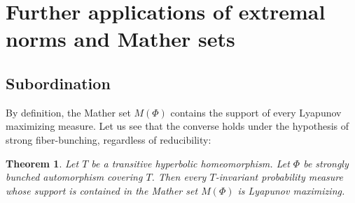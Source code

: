 \documentclass[10pt]{amsart}
\theoremstyle{plain}
\newtheorem{theorem}{Theorem}[section]
\theoremstyle{definition}
\begin{document}
\section{Further applications of extremal norms and Mather sets}\label{s.app}

\subsection{Subordination}\label{ss.subordination}

By definition, the Mather set $M(\Phi)$ contains the support of every Lyapunov maximizing measure. Let us see that the converse holds under the hypothesis of strong fiber-bunching, regardless of reducibility:

\begin{theorem}\label{t.subordination}
Let $T$ be a transitive hyperbolic homeomorphism.
Let $\Phi$ be strongly bunched automorphism covering $T$.
Then every $T$-invariant probability measure whose support is contained in the Mather set $M(\Phi)$ is Lyapunov maximizing.
\end{theorem}
\end{document}
